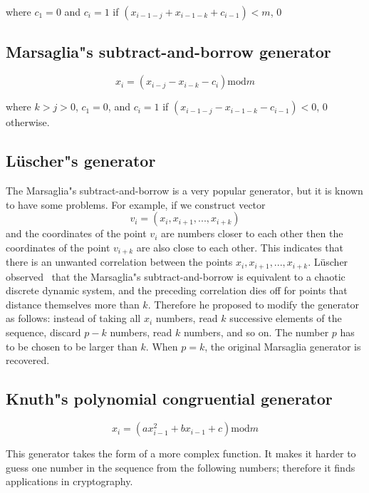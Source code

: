 \documentclass[justified, sixbynine]{tufte-book}
\theoremstyle{plain}%
\newtheorem * {corollary}{Corollary}
\theoremstyle{definition}
\theoremstyle{remark}
\newtheorem * {remark}{Remark}
\newtheorem * {note}{Note}
\begin{document}
\begin{fullwidth}
where $c_1=0$ and $c_i=1$ if $(x_{i-1-j}+x_{i-1-k}+c_{i-1})<m$, $0$

\goodbreak\subsection{Marsaglia"s subtract-and-borrow generator}

\begin{equation}
x_i=(x_{i-j}-x_{i-k}-c_i)\textrm{mod}m
\end{equation}

where $k>j>0$, $c_1=0$, and $c_i=1$ if $(x_{i-1-j}-x_{i-1-k}-c_{i-1})<0$, $0$
otherwise.

\goodbreak\subsection{L\"uscher"s generator}

The Marsaglia"s subtract-and-borrow is a very popular generator, but it is known
to have some problems. For example, if we construct vector
\begin{equation}
v_i=(x_i, x_{i+1}, ..., x_{i+k})
\end{equation}
and the coordinates of the point $v_i$ are numbers closer to each other then
the coordinates of the point $v_{i+k}$ are also close to each other. This
indicates that there is an unwanted correlation between the points $%
x_i, x_{i+1}, ..., x_{i+k}$. L\"uscher observed~\cite{lusher} that the Marsaglia"s
subtract-and-borrow is equivalent to a chaotic discrete dynamic system, and
the preceding correlation dies off for points that distance themselves more than $k$. Therefore
he proposed to modify the generator as follows: instead of taking all $x_i$
numbers, read $k$ successive elements of the sequence, discard $p-k$
numbers, read $k$ numbers, and so on. The number $p$ has to be chosen to be
larger than $k$. When $p=k$, the original Marsaglia generator is recovered.

\goodbreak\subsection{Knuth"s polynomial congruential generator}

\begin{equation}
x_i=(ax_{i-1}^2+bx_{i-1}+c)\textrm{mod}m
\end{equation}

This generator takes the form of a more complex function. It makes it harder to guess one number in the sequence from the following numbers; therefore
it finds applications in cryptography.


\end{fullwidth}
\end{document}

